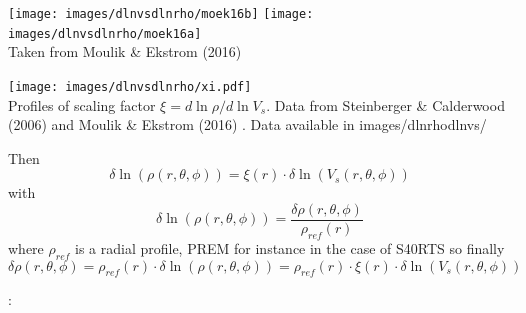 \begin{center}
\texttt{[image: images/dlnvsdlnrho/moek16b]}
\texttt{[image: images/dlnvsdlnrho/moek16a]}\\
{\captionfont Taken from Moulik \& Ekstrom (2016) \cite{moek16}}
\end{center}

\begin{center}
\texttt{[image: images/dlnvsdlnrho/xi.pdf]}\\
{\captionfont Profiles of scaling factor $\xi=d \ln \rho/d\ln V_s$. Data from 
Steinberger \& Calderwood (2006) \cite{stca06} and Moulik \& Ekstrom (2016) \cite{moek16}.
Data available in images/dlnrhodlnvs/} 
\end{center}

Then
\[
\delta \ln(\rho(r,\theta,\phi)) = \xi(r) \cdot \delta \ln (V_s(r,\theta,\phi) )
\]
with  
\[
\delta \ln (\rho(r,\theta,\phi)) = \frac{ \delta \rho(r,\theta,\phi)}{\rho_{ref}(r)}
\]
where $\rho_{ref}$ is a radial profile, PREM for instance in the case of S40RTS 
so finally 
\[
\delta \rho(r,\theta,\phi) 
= \rho_{ref}(r) \cdot  \delta \ln(\rho(r,\theta,\phi)) 
= \rho_{ref}(r)\cdot \xi(r) \cdot \delta \ln(V_s(r,\theta,\phi)) 
\]






\Literature: \cite{roma01}
